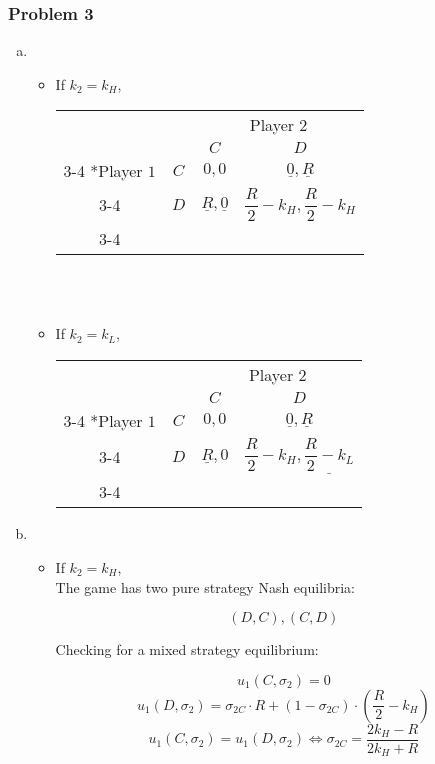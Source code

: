 \documentclass[a4paper]{article}
\begin{document}
\subsubsection{Problem 3}
\begin{enumerate}[(a)]
\item
\begin{itemize}
\item If $k_2=k_H$,\\
{\renewcommand{\arraystretch}{2}
\begin{tabular}{cc|c|c|}
      & \multicolumn{1}{c}{} & \multicolumn{2}{c}{Player $2$}\\
      & \multicolumn{1}{c}{} & \multicolumn{1}{c}{$C$}  & \multicolumn{1}{c}{$D$} \\\cline{3-4}
      \multirow{2}*{Player $1$}  & $C$ & $0,0$ & $\underline{0},\underline{R}$ \\\cline{3-4}
      & $D$ & $\underline{R},\underline{0}$ & $\dfrac{R}{2}-k_H,\dfrac{R}{2}-k_H$ \\\cline{3-4}
\end{tabular}
}\\
\\
\item If $k_2=k_L$,\\
{\renewcommand{\arraystretch}{2}
\begin{tabular}{cc|c|c|}
      & \multicolumn{1}{c}{} & \multicolumn{2}{c}{Player $2$}\\
      & \multicolumn{1}{c}{} & \multicolumn{1}{c}{$C$}  & \multicolumn{1}{c}{$D$} \\\cline{3-4}
      \multirow{2}*{Player $1$}  & $C$ & $0,0$ & $\underline{0},\underline{R}$ \\\cline{3-4}
      & $D$ & $\underline{R},0$ & $\dfrac{R}{2}-k_H,\underline{\dfrac{R}{2}-k_L}$ \\\cline{3-4}
\end{tabular}
}
\end{itemize}
\item
\begin{itemize}
\item
If $k_2=k_H$,\\
The game has two pure strategy Nash equilibria:

$$(D, C),(C,D) $$ 

Checking for a mixed strategy equilibrium:

$$u_1(C, \sigma_2)=0$$
$$u_1(D,\sigma_2)=\sigma_{2C}\cdot R+(1-\sigma_{2C})\cdot\left(\dfrac{R}{2}-k_H\right)$$
$$u_1(C, \sigma_2)=u_1(D,\sigma_2) \iff \sigma_{2C}=\dfrac{2k_H-R}{2k_H+R}$$


\end{itemize}
\end{enumerate}
\end{document}
